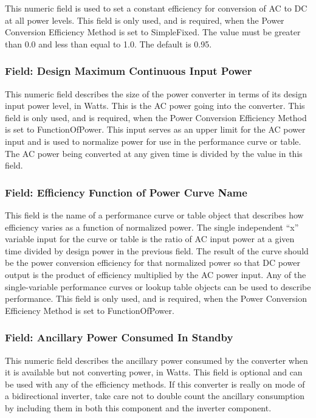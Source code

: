This numeric field is used to set a constant efficiency for conversion of AC to DC at all power levels. This field is only used, and is required, when the Power Conversion Efficiency Method is set to SimpleFixed. The value must be greater than 0.0 and less than equal to 1.0. The default is 0.95.

\subsubsection{Field: Design Maximum Continuous Input Power}\label{field-design-maximum-continuous-input-power}

This numeric field describes the size of the power converter in terms of its design input power level, in Watts. This is the AC power going into the converter. This field is only used, and is required, when the Power Conversion Efficiency Method is set to FunctionOfPower. This input serves as an upper limit for the AC power input and is used to normalize power for use in the performance curve or table. The AC power being converted at any given time is divided by the value in this field.

\subsubsection{Field: Efficiency Function of Power Curve Name}\label{field-efficiency-function-of-power-curve-name-1}

This field is the name of a performance curve or table object that describes how efficiency varies as a function of normalized power. The single independent ``x'' variable input for the curve or table is the ratio of AC input power at a given time divided by design power in the previous field. The result of the curve should be the power conversion efficiency for that normalized power so that DC power output is the product of efficiency multiplied by the AC power input. Any of the single-variable performance curves or lookup table objects can be used to describe performance. This field is only used, and is required, when the Power Conversion Efficiency Method is set to FunctionOfPower.

\subsubsection{Field: Ancillary Power Consumed In Standby}\label{field-ancillary-power-consumed-in-standby-1}

This numeric field describes the ancillary power consumed by the converter when it is available but not converting power, in Watts. This field is optional and can be used with any of the efficiency methods. If this converter is really on mode of a bidirectional inverter, take care not to double count the ancillary consumption by including them in both this component and the inverter component.

